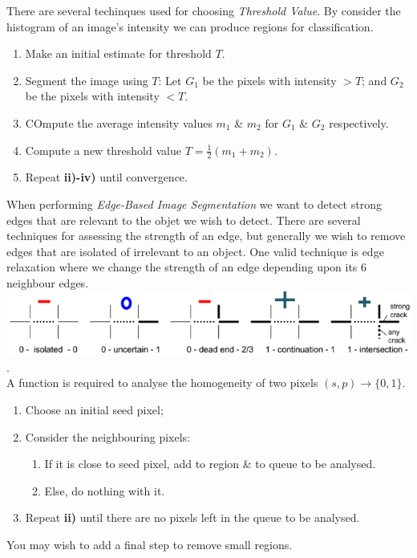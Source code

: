 \documentclass[11pt,a4paper]{article}
\begin{document}
There are several techinques used for choosing \textit{Threshold Value}. By consider the histogram of an image's intensity we can produce regions for classification.
\begin{enumerate}[label=\roman*)]
	\item Make an initial estimate for threshold $T$.
	\item Segment the image using $T$: Let $G_1$ be the pixels with intensity $>T$; and $G_2$ be the pixels with intensity $<T$.
	\item COmpute the average intensity values $m_1$ \& $m_2$ for $G_1$ \& $G_2$ respectively.
	\item Compute a new threshold value $T=\frac{1}{2}(m_1+m_2)$.
	\item Repeat \textbf{ii)-iv)} until convergence.
\end{enumerate}

When performing \textit{Edge-Based Image Segmentation} we want to detect strong edges that are relevant to the objet we wish to detect. There are several techniques for assessing the strength of an edge, but generally we wish to remove edges that are isolated of irrelevant to an object. One valid technique is edge relaxation where we change the strength of an edge depending upon its 6 neighbour edges.\\
\includegraphics[scale=.7]{img/edgeRelaxation.png}.\\

A function is required to analyse the homogeneity of two pixels $(s,p)\to\{0,1\}$.
\begin{enumerate}[label=\roman*)]
	\item Choose an initial seed pixel;
	\item Consider the neighbouring pixels:
	\begin{enumerate}
		\item If it is close to seed pixel, add to region \& to queue to be analysed.
		\item Else, do nothing with it.
	\end{enumerate}
	\item Repeat \textbf{ii)} until there are no pixels left in the queue to be analysed.
\end{enumerate}
\nb You may wish to add a final step to remove small regions.\\
\end{document}
